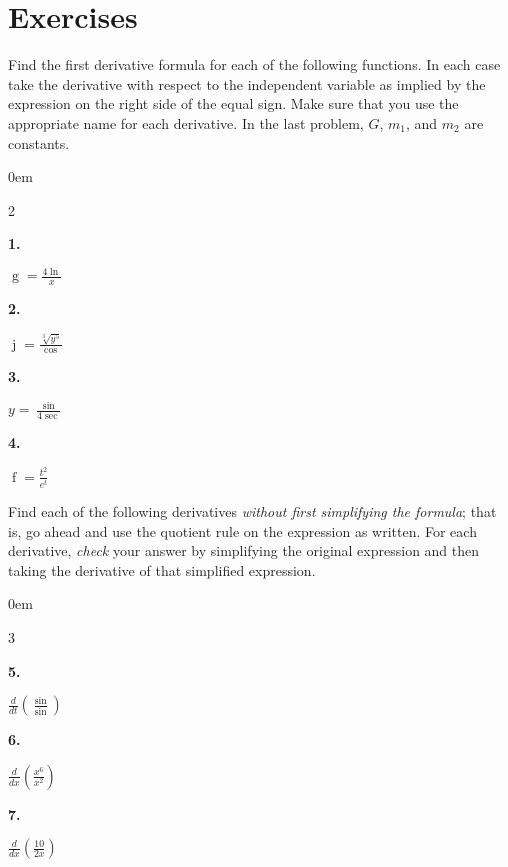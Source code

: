 \documentclass[12pt,]{book}
\theoremstyle{plain}
\theoremstyle{definition}
\numberwithin{equation}{section}
\newenvironment{exercisegroup}%
{\medskip\noindent}%
{\par\bigskip}%
\newlength{\exercisegroupindent}%
\newlength{\exercisegroupitemwidth}%
\newenvironment{exercisegrouplist}%
{\vspace{-\partopsep}%
\begin{adjustwidth}{\exercisegroupindent}{0em}}%
{\end{adjustwidth}%
\vspace{-\partopsep}%
\vspace{\baselineskip}}%
\newenvironment{exercisegroupbycol}[1]%
{\begin{exercisegrouplist}%
\vspace{-\multicolsep}%
\begin{multicols}{#1}%
\setlength{\parindent}{0em}%
\setlength{\exercisegroupitemwidth}{\linewidth}}%
{\end{multicols}%
\vspace{-\multicolsep}%
\end{exercisegrouplist}}%
\newenvironment{exercisegroupitem}[1]%
{\begin{minipage}[t]{\exercisegroupitemwidth}
\vspace{0pt}%
{\bfseries#1}%
\rule{0pt}{\baselineskip}}{\strut%
\end{minipage}%
\hspace{\columnsep}}%
\providecommand\phantomsection{}
\newcommand{\fe}[2]{\mathop{{#1}{\left(#2\right)}}}
\newcommand{\lzoo}[2]{{\frac{d}{d#1}}{\left(#2\right)}}
\begin{document}
\section*{Exercises}\label{exercises-34}

\begin{exercisegroup}%
Find the first derivative formula for each of the following functions.  In each case take the derivative with respect to the independent variable as implied by the expression on the right side of the equal sign.  Make sure that you use the appropriate name for each derivative. In the last problem, \(G\), \(m_1\), and \(m_2\) are constants.%
\begin{exercisegroupbycol}{2}%
\begin{exercisegroupitem}{1. }\phantomsection\hypertarget{exercise-257}{\null}
\(\fe{g}{x}=\frac{4\fe{\ln}{x}}{x}\)%
\end{exercisegroupitem}%
\par%
\begin{exercisegroupitem}{2. }\phantomsection\hypertarget{exercise-258}{\null}
\(\fe{j}{y}=\frac{\sqrt[3]{y^5}}{\fe{\cos}{y}}\)%
\end{exercisegroupitem}%
\par%
\begin{exercisegroupitem}{3. }\phantomsection\hypertarget{exercise-259}{\null}
\(y=\frac{\fe{\sin}{x}}{4\fe{\sec}{x}}\)%
\end{exercisegroupitem}%
\par%
\begin{exercisegroupitem}{4. }\phantomsection\hypertarget{exercise-260}{\null}
\(\fe{f}{t}=\frac{t^2}{e^t}\)%
\end{exercisegroupitem}%
\par%
\end{exercisegroupbycol}%
\end{exercisegroup}%
\begin{exercisegroup}%
Find each of the following derivatives \emph{without first simplifying the formula}; that is, go ahead and use the quotient rule on the expression as written. For each derivative, \emph{check} your answer by simplifying the original expression and then taking the derivative of that simplified expression.%
\begin{exercisegroupbycol}{3}%
\begin{exercisegroupitem}{5. }\phantomsection\hypertarget{unsimplified-quotient-first}{\null}
\(\lzoo{t}{\frac{\fe{\sin}{t}}{\fe{\sin}{t}}}\)%
\end{exercisegroupitem}%
\par%
\begin{exercisegroupitem}{6. }\phantomsection\hypertarget{exercise-262}{\null}
\(\lzoo{x}{\frac{x^6}{x^2}}\)%
\end{exercisegroupitem}%
\par%
\begin{exercisegroupitem}{7. }\phantomsection\hypertarget{unsimplified-quotient-last}{\null}
\(\lzoo{x}{\frac{10}{2x}}\)%
\end{exercisegroupitem}%
\par%
\end{exercisegroupbycol}%
\end{exercisegroup}%
\end{document}
